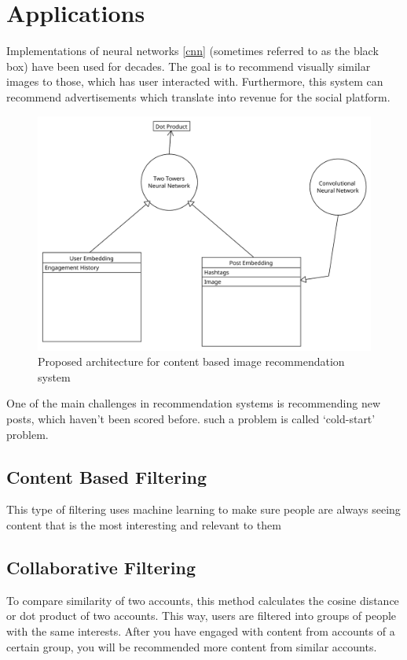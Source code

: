 \section{Applications} \label{applications}

Implementations of neural networks \ref{cnn} (sometimes referred to as the black box) have been used for decades. The goal is to recommend visually similar images to those, which has user interacted with. Furthermore, this system can recommend advertisements which translate into revenue for the social platform. 

\begin{figure}[h]
    \centering
    \includegraphics[width=0.7\linewidth]{Diagrams/architecture.pdf}
    \caption{Proposed architecture for content based image recommendation system}
    \label{fig:proposed-alogrithm}
\end{figure}

One of the main challenges in recommendation systems is recommending new posts, which haven't been scored before. such a problem is called ‘cold-start' problem. \cite{10373857}

\subsection{Content Based Filtering}\label{applications/content-based-filtering}

This type of filtering uses machine learning to make sure people are always seeing content that is the most interesting and relevant to them \cite{ig-new-content}


\subsection{Collaborative Filtering}\label{applications/collaborative-filtering}

To compare similarity of two accounts, this method calculates the cosine distance or dot product of two accounts. \cite{ig-explore} This way, users are filtered into groups of people with the same interests. After you have engaged with content from accounts of a certain group, you will be recommended more content from similar accounts. 